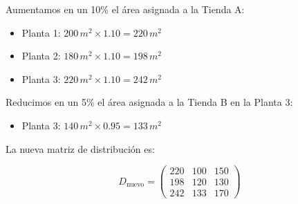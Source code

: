 \documentclass[addpoints,spanish, 12pt,a4paper]{exam}
\begin{document}
\begin{questions}
\begin{parts}
    \begin{solution}
    Aumentamos en un 10\% el área asignada a la Tienda A:
    \begin{itemize}
        \item Planta 1: \( 200 \, m^2 \times 1.10 = 220 \, m^2 \)
        \item Planta 2: \( 180 \, m^2 \times 1.10 = 198 \, m^2 \)
        \item Planta 3: \( 220 \, m^2 \times 1.10 = 242 \, m^2 \)
    \end{itemize}

    Reducimos en un 5\% el área asignada a la Tienda B en la Planta 3:
    \begin{itemize}
        \item Planta 3: \( 140 \, m^2 \times 0.95 = 133 \, m^2 \)
    \end{itemize}

    La nueva matriz de distribución es:

    \[
    D_{\text{nuevo}} = \begin{pmatrix}
    220 & 100 & 150 \\
    198 & 120 & 130 \\
    242 & 133 & 170
    \end{pmatrix}
    \]
    \end{solution}

\end{parts}



\addpoints

\end{questions}
\end{document}
